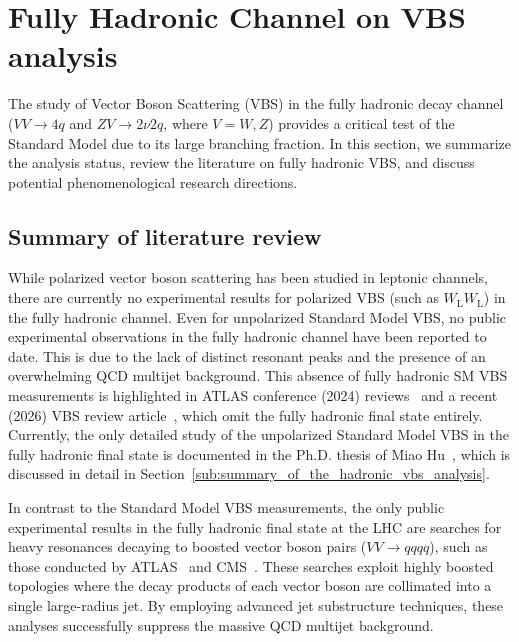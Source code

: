\documentclass[12pt]{article}
\begin{document}


\section{Fully Hadronic Channel on VBS analysis}%
\label{sec:fully_hadronic_channel_on_vbs_analysis}

    The study of Vector Boson Scattering (VBS) in the fully hadronic decay channel ($VV \to 4q$ and $ZV \to 2\nu 2q$, where $V = W, Z$) provides a critical test of the Standard Model due to its large branching fraction. In this section, we summarize the analysis status, review the literature on fully hadronic VBS, and discuss potential phenomenological research directions.

    \subsection{Summary of literature review}%
    \label{sub:summary_of_literature_review}

        While polarized vector boson scattering has been studied in leptonic channels, there are currently no experimental results for polarized VBS (such as $W_{\text{L}} W_{\text{L}}$) in the fully hadronic channel. Even for unpolarized Standard Model VBS, no public experimental observations in the fully hadronic channel have been reported to date. This is due to the lack of distinct resonant peaks and the presence of an overwhelming QCD multijet background. This absence of fully hadronic SM VBS measurements is highlighted in ATLAS conference (2024) reviews~\cite{Wang:2909208} and a recent (2026) VBS review article~\cite{Folgueras:2026}, which omit the fully hadronic final state entirely. Currently, the only detailed study of the unpolarized Standard Model VBS in the fully hadronic final state is documented in the Ph.D. thesis of Miao Hu~\cite{hu_2022}, which is discussed in detail in Section~\ref{sub:summary_of_the_hadronic_vbs_analysis}.

        In contrast to the Standard Model VBS measurements, the only public experimental results in the fully hadronic final state at the LHC are searches for heavy resonances decaying to boosted vector boson pairs ($VV \to qqqq$), such as those conducted by ATLAS~\cite{ATLAS:2019jov} and CMS~\cite{CMS:2022qyn}. These searches exploit highly boosted topologies where the decay products of each vector boson are collimated into a single large-radius jet. By employing advanced jet substructure techniques, these analyses successfully suppress the massive QCD multijet background.
\end{document}
